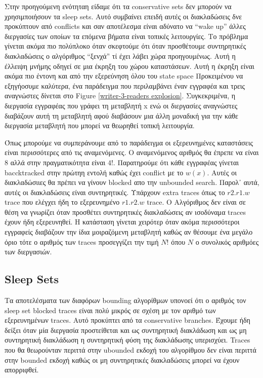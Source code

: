 Στην προηγούμενη ενότηταη είδαμε ότι τα conservative sets δεν μπορούν να χρησιμποιήσουν τα sleep sets. Αυτό συμβαίνει 
επειδή αυτές οι διακλαδώσεις δνε προκύπτουν από conflicts και σαν αποτέλεσμα είναι αδύνατο να ``wake up'' άλλες διεργασίες
των οποίων τα επόμενα βήματα είναι τοπικές λειτουργίες. Το πρόβλημα γίνεται ακόμα πιο πολύπλοκο όταν σκεφτούμε ότι όταν προσθέτουμε
συντηρητικές διακλαδώσεις ο αλγόριθμος ``ξενχά'' τί έχει λάβει χώρα προηγουμένως. Αυτή η έλλειψη μνήμης οδηγεί σε μια έκρηξη του 
χώρου καταστάσεων. Αυτή η έκρηξη είναι ακόμα πιο έντονη και από την εξερεύνηση όλου του state space
Προκειμένου να εξηγήοσυμε καλύτερα, ένα παράδειγμα που περιλαμβάνει έναν εγγραφέα και τρεις αναγνώστες δίνεται στο Figure \ref{writer-3-readers
explosion}. Συγκεκριμένα, η διεργασία εγγραφέας που γράφει τη μεταβλητή x ενώ οι διεργασίες αναγνώστες διαβάζουν αυτή τη μεταβλητή
αφού διαβάσουν μια άλλη μοναδική για την κάθε διεργασία μεταβλητή που μπορεί να θεωρηθεί τοπική λειτουργία.


Όπως μπορούμε να συμπεράνουμε από το παράδειγμα οι εξερευνημένες καταστάσεις είναι περισσότερες από τις αναμενόμενες. 
Ο αναμενόμενος αριθμός θα έπρεπε να είναι $8$ αλλά στην πραγματικότητα είναι $4!$. Παρατηρούμε ότι κάθε εγγραφέας γίνεται baccktracked 
στην πρώτηη εντολή καθώς έχει conflict με το $w(x)$. Αυτές οι διακλαδώσιιες θα πρέπει να γίνουν blocked απο την unbounded search. 
Παρολ᾽ αυτά, αυτές οι διακλαδώσεις είναι συντηρητικές.
Υπάρχουν  extra traces όπως το $r2.r1.w$ trace που ελέγχει ήδη το εξερευνημένο $r1.r2.w$ trace. 
Ο Αλγόριθμος δεν είναι σε θέση να γνωρίζει όταν προσθέτει συντηρητικές διακλαδώσεις 
αν ισοδύναμα traces έχουν ήδη εξερευνηθεί. Η κατάσταση γίνεται χειρότερ όταν ακόμα περισσότεροι εγγραφείς διαβάζουν
την ίδια μοιραζόμενη μεταβλητή καθώς αν θέσουμε ένα μεγάλο όριο τότε ο αριθμός των traces προσεγγίζει την τιμή $N!$ 
όπου $N$ ο συνολικός αριθμόες των διεργασιών. 

\subsection{Sleep Sets}
Τα αποτελέσματα των διαφόρων  bounding αλγορίθμων υπονοεί ότι ο αριθμός τον sleep set blocked traces είναι πολύ μικρός
σε σχέση με τον αριθμό των εξερευνημένων traces. Αυτό προκύπτει από τα conservative branches. Έχουμε ήδη δείξει όταν μία διεργασία
προστείθεται και ως συντηρητική διακλάδωση και ως μη συντηρητική διακλάδωση η συντηρητική φύση της διακλάδωσης υπερισχύει.
Traces που θα θεωρούνταν περιττά στην ubounded εκδοχή του αλγορίθμου δεν είναι περιττά στην bounded εκδοχή καθώς οι μη 
συντηρητικές διακλαδώσεις μπορεί να έχουν απορριφθεί.

